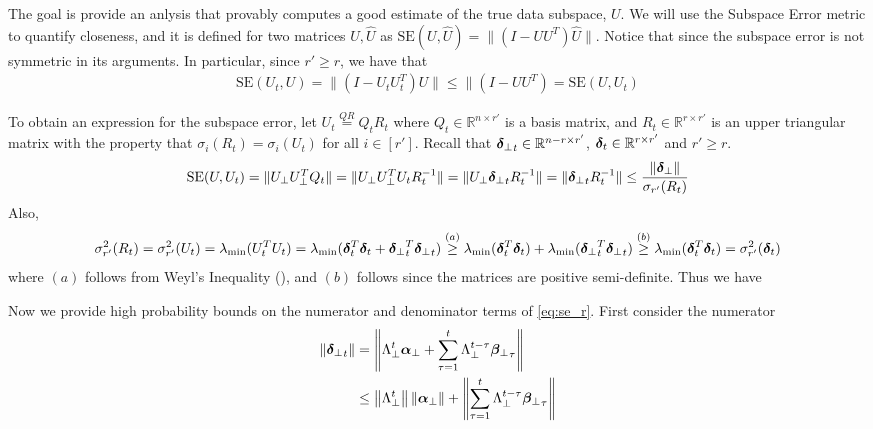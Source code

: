 \documentclass[10pt]{article}
\newcommand{\R}{\mathbb{R}}
\newcommand{\norm}[1]{\left\|#1\right\|}
\newcommand{\SE}{\mathrm{SE}}
\begin{document}
The goal is provide an anlysis that provably computes a good estimate of the true data subspace, $U$. We will use the Subspace Error metric to quantify closeness, and it is defined for two matrices $U, \hat U$ as $\SE(U, \hat U) = \|(I - U U^T)\hat U\|$. Notice that since the subspace error is not symmetric in its arguments. In particular, since $r' \geq r$, we have that 
\begin{align*}
\SE(U_t, U) = \|(I  - U_t U_t^T) U\| \leq \|(I - U U^T) = \SE(U, U_t)
\end{align*}

To obtain an expression for the subspace error, let $U_t \overset{QR}{=} Q_t R_t$ where $Q_t \in \R^{n \times r'}$ is a basis matrix, and $R_t \in \R^{r \times r'}$ is an upper triangular matrix with the property that $\sigma_i(R_t) = \sigma_i(U_t)$ for all $ i \in [r']$. Recall that $\utsin_t \in \R^{n -r \times r'}$, $\utcos_t \in \R^{r \times r'}$ and $r' \geq r$. 
\begin{align*}
\SE(U, U_t) = \|U_\perp U_\perp^T Q_t\| = \|U_\perp U_\perp^T U_t R_t^{-1}\|  = \|U_\perp \utsin_t R_t^{-1}\| = \|\utsin_t R_t^{-1}\| \leq \frac{\|\utsin\|}{\sigma_{r'}(R_t)}
\end{align*}
Also,
\begin{align}\label{eq:se_r}
\sigma_{r'}^2(R_t) = \sigma_{r'}^2(U_t) = \lambda_{\min}(U_t^T U_t) = \lambda_{\min}(\bm{\delta}_t^T \bm{\delta}_t + {\bm{\delta}_{\perp}}_t^T {\bm{\delta}_{\perp}}_t) \overset{(a)}{\geq} \lambda_{\min}(\bm{\delta}_t^T \bm{\delta}_t) + \lambda_{\min}({\bm{\delta}_{\perp}}_t^T {\bm{\delta}_{\perp}}_t) \overset{(b)}{\geq} \lambda_{\min}(\bm{\delta}_t^T \bm{\delta}_t) = \sigma_{r'}^2(\bm{\delta}_t)
\end{align}
where $(a)$ follows from Weyl's Inequality (\cite[Theorem 4.3.1]{horn_johnson}), and $(b)$ follows since the matrices are positive semi-definite. Thus we have 


%

\noindent Now we provide high probability bounds on the numerator and denominator terms of \eqref{eq:se_r}. First consider the numerator 
\begin{align*}
\|\utsin_t\| &= \norm{\Lambda_\perp^t \usin + \sum_{\tau=1}^t \Lambda_\perp^{t-\tau} \wsin_\tau} \\
&\leq \norm{\Lambda_\perp^t} \norm{\usin} + \norm{\sum_{\tau=1}^t \Lambda_\perp^{t-\tau} \wsin_\tau} 
\end{align*}
\end{document}

